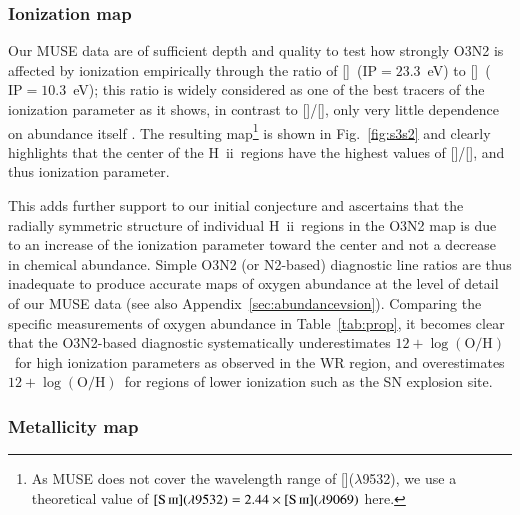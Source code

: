 \documentclass[traditabstract]{aa}
\newcommand{\hii}{\mbox{H~{\sc ii}}}
\newcommand{\oh}{12+\log(\mathrm{O/H})}
\newcommand{\sii}{[\ion{S}{ii}]}
\newcommand{\siii}{[\ion{S}{iii}]}
\newcommand{\oii}{[\ion{O}{ii}]}
\newcommand{\oiii}{[\ion{O}{iii}]}
\begin{document}
\subsubsection{Ionization map}

Our MUSE data are of sufficient depth and quality to test how strongly O3N2 is affected by ionization empirically through the ratio of \siii~($\mathrm{IP}=23.3$~eV) to \sii~($\mathrm{IP}=10.3$~eV); this ratio is widely considered as one of the best tracers of the ionization parameter \citep{1991MNRAS.253..245D} as it shows, in contrast to \oiii/\oii, only very little dependence on abundance itself \citep{2002ApJS..142...35K, 2011MNRAS.415.3616D}. The resulting map\footnote{As MUSE does not cover the wavelength range of \siii($\lambda$9532), we use a theoretical value of $\siii(\lambda9532)=2.44\times\siii(\lambda9069)$ \citep{1982MNRAS.199.1025M} here.} is shown in Fig.~\ref{fig:s3s2} and clearly highlights that the center of the \hii~regions have the highest values of \siii/\sii, and thus ionization parameter.

This adds further support to our initial conjecture and ascertains that the radially symmetric structure of individual \hii\  regions in the O3N2 map is due to an increase of the ionization parameter toward the center and not a decrease in chemical abundance. Simple O3N2 (or N2-based) diagnostic line ratios are thus inadequate to produce accurate maps of oxygen abundance at the level of detail of our MUSE data (see also Appendix~\ref{sec:abundancevsion}). Comparing the specific measurements of oxygen abundance in Table~\ref{tab:prop}, it becomes clear that the O3N2-based diagnostic systematically underestimates $\oh$~for high ionization parameters as observed in the WR region, and overestimates $\oh$\ for regions of lower ionization such as the SN explosion site.

\subsubsection{Metallicity map}
\label{sec:mapoh}
\end{document}

